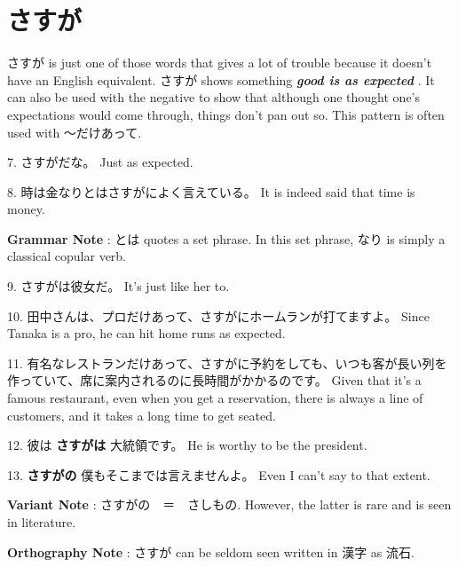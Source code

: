\section{さすが}
 
\par{ さすが is just one of those words that gives a lot of trouble because it doesn't have an English equivalent. さすが shows something \textbf{\emph{good is as expected }}. It can also be used with the negative to show that although one thought one's expectations would come through, things don't pan out so. This pattern is often used with ～だけあって. }

\par{7. さすがだな。 \hfill\break
Just as expected. }

\par{8. 時は金なりとはさすがによく言えている。 \hfill\break
It is indeed said that time is money. }

\par{\textbf{Grammar Note }: とは quotes a set phrase. In this set phrase, なり is simply a classical copular verb. }

\par{9. さすがは彼女だ。 \hfill\break
It's just like her to. }

\par{10. 田中さんは、プロだけあって、さすがにホームランが打てますよ。 \hfill\break
Since Tanaka is a pro, he can hit home runs as expected. }

\par{11. 有名なレストランだけあって、さすがに予約をしても、いつも客が長い列を作っていて、席に案内されるのに長時間がかかるのです。 \hfill\break
Given that it's a famous restaurant, even when you get a reservation, there is always a line of customers, and it takes a long time to get seated. }

\par{12. 彼は \textbf{さすがは }大統領です。 \hfill\break
He is worthy to be the president. }

\par{13. \textbf{さすがの }僕もそこまでは言えませんよ。 \hfill\break
Even I can't say to that extent. }

\par{\textbf{Variant Note }: さすがの　＝　さしもの. However, the latter is rare and is seen in literature. }

\par{\textbf{Orthography Note }: さすが can be seldom seen written in 漢字 as 流石. }
    